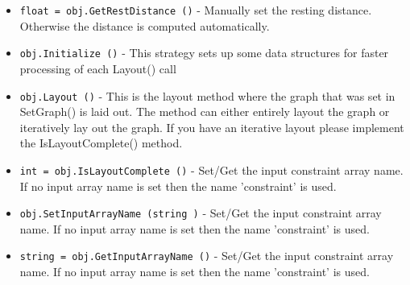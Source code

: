 \begin{itemize}
\item  \verb|float = obj.GetRestDistance ()| -  Manually set the resting distance. Otherwise the
 distance is computed automatically.

\item  \verb|obj.Initialize ()| -  This strategy sets up some data structures
 for faster processing of each Layout() call

\item  \verb|obj.Layout ()| -  This is the layout method where the graph that was
 set in SetGraph() is laid out. The method can either
 entirely layout the graph or iteratively lay out the
 graph. If you have an iterative layout please implement
 the IsLayoutComplete() method.

\item  \verb|int = obj.IsLayoutComplete ()| -  Set/Get the input constraint array name. If no input array 
 name is set then the name 'constraint' is used.

\item  \verb|obj.SetInputArrayName (string )| -  Set/Get the input constraint array name. If no input array 
 name is set then the name 'constraint' is used.

\item  \verb|string = obj.GetInputArrayName ()| -  Set/Get the input constraint array name. If no input array 
 name is set then the name 'constraint' is used.

\end{itemize}
